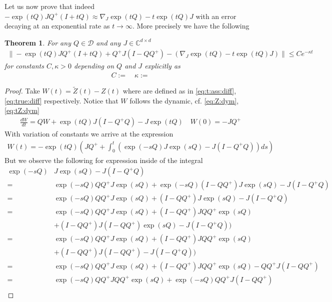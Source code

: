 \documentclass[twoside]{article}
\numberwithin{equation}{section}
\newtheorem{Theorem}{Theorem}[section]
\newcommand{\CC}{\mathbb{C}}
\begin{document}
Let us now prove that indeed  $ -\exp(t Q) J Q^+  ( I + t Q) \approx \nabla_J \exp(t Q) - t  \exp(t Q) J$ with an error decaying at an exponential rate as $t \to \infty$.  
More precisely we have the following
\begin{Theorem}\label{thm:ass:error}
For any $Q \in \mathcal{D}$ and any $J \in \CC^{d \times d}$
\begin{align}
   \| -\exp(t Q) J Q^+  ( I + t Q) + Q^+ J (I- Q Q^+)  - (\nabla_J \exp(t Q) - t  \exp(t Q) J)\| \leq Ce^{-\kappa t}
\end{align}
for constants $C, \kappa > 0$ depending on $Q$ and $J$ explicitly as
\begin{align}
	C :=  \quad
	\kappa := 
\end{align}
\end{Theorem}
\begin{proof}
Take $W(t) =  \tilde{Z}(t) - Z(t)$ where are defined as in \eqref{eq:t:ass:diff}, \eqref{eq:true:diff} respectively.
Notice that $W$ follows the dynamic, cf. \eqref{eq:Z:dym}, \eqref{eq:tZ:dym}
\begin{align}
 	\frac{d W}{dt} = Q W +  \exp(t Q) J (I - Q^+Q) -  J \exp(t Q) \quad W(0) =- J Q^+
	\label{eq:ass:err:eq}
\end{align}
With variation of constants we arrive at the expression
\begin{align}
W(t) = - \exp(tQ)\left(J Q^+ + \int_0^t (\exp(-sQ) J \exp(s Q) - J (I - Q^+Q)) ds\right)
	\label{eq:ass:err:sol}
\end{align}
But we observe the following for expression inside of the integral 
\begin{align*}
	\exp(-sQ)& J \exp(s Q) - J (I - Q^+Q)\\
	=& \exp(-sQ) Q Q^+ J \exp(s Q) + \exp(-sQ) (I - Q Q^+ )J \exp(s Q) - J (I - Q^+Q)\\
	=&\exp(-sQ) Q Q^+ J \exp(s Q) + (I - Q Q^+ )J \exp(s Q) - J (I - Q^+Q)\\
 	=&\exp(-sQ) Q Q^+ J \exp(s Q) + (I - Q Q^+ )J QQ^+ \exp(s Q) \\
	    &+ (I - Q Q^+ )J( I - QQ^+) \exp(s Q) - J (I - Q^+Q))\\
	=&\exp(-sQ) Q Q^+ J \exp(s Q) + (I - Q Q^+ )J QQ^+ \exp(s Q) \\
	    &+ (I - Q Q^+ )J( I - QQ^+)  - J (I - Q^+Q))\\
	=&  \exp(-sQ) Q Q^+ J \exp(s Q) + (I - Q Q^+ )J QQ^+ \exp(s Q) - Q Q^+ J( I - QQ^+) \\
	=&  \exp(-sQ) Q Q^+ J  Q Q^+ \exp(s Q) +  \exp(-sQ) Q Q^+ J (I- Q Q^+)  \\

\end{align*}
\end{proof}
\end{document}
